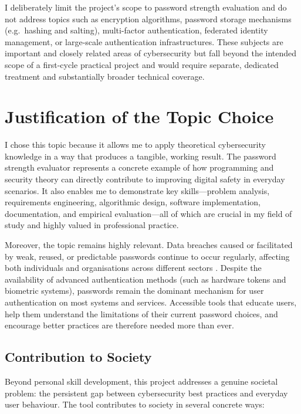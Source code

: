 I deliberately limit the project's scope to password strength evaluation and do not address topics such as encryption algorithms, password storage mechanisms (e.g.\ hashing and salting), multi-factor authentication, federated identity management, or large-scale authentication infrastructures. These subjects are important and closely related areas of cybersecurity but fall beyond the intended scope of a first-cycle practical project and would require separate, dedicated treatment and substantially broader technical coverage.

\clearpage

\section{Justification of the Topic Choice}

I chose this topic because it allows me to apply theoretical cybersecurity knowledge in a way that produces a tangible, working result. The password strength evaluator represents a concrete example of how programming and security theory can directly contribute to improving digital safety in everyday scenarios. It also enables me to demonstrate key skills---problem analysis, requirements engineering, algorithmic design, software implementation, documentation, and empirical evaluation---all of which are crucial in my field of study and highly valued in professional practice.

Moreover, the topic remains highly relevant. Data breaches caused or facilitated by weak, reused, or predictable passwords continue to occur regularly, affecting both individuals and organisations across different sectors \cite{verizon2024}. Despite the availability of advanced authentication methods (such as hardware tokens and biometric systems), passwords remain the dominant mechanism for user authentication on most systems and services. Accessible tools that educate users, help them understand the limitations of their current password choices, and encourage better practices are therefore needed more than ever.

\subsection{Contribution to Society}

Beyond personal skill development, this project addresses a genuine societal problem: the persistent gap between cybersecurity best practices and everyday user behaviour. The tool contributes to society in several concrete ways:

